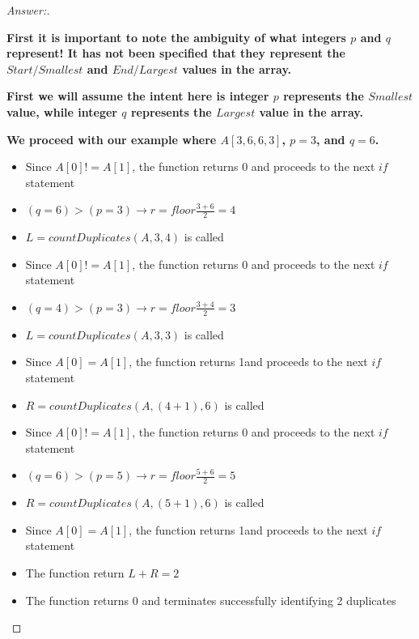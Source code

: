 \documentclass[11pt]{article}
\theoremstyle{definition}
\theoremstyle{definition}
\theoremstyle{definition}
\begin{document}
\begin{proof}[Answer:] \
\item \textbf{First it is important to note the ambiguity of what integers $p$ and $q$ represent! It has not been specified that they represent the $Start / Smallest$ and $End / Largest$ values in the array.}
\item \textbf{First we will assume the intent here is integer $p$ represents the $Smallest$ value, while integer $q$ represents the $Largest$ value in the array.}
\item \textbf{We proceed with our example where $A[3, 6, 6, 3]$, $p = 3$, and $q = 6$.}
\begin{itemize}
\item Since $A[0] != A[1]$, the function returns 0 and proceeds to the next $if$ statement
\item $(q = 6) > (p = 3) \to r = floor \frac{3 + 6}{2} = 4$
\item $L = countDuplicates (A, 3, 4)$ is called
\item Since $A[0] != A[1]$, the function returns 0 and proceeds to the next $if$ statement
\item $(q = 4) > (p = 3) \to r = floor \frac{3 + 4}{2} = 3$
\item $L = countDuplicates (A, 3, 3)$ is called
\item Since $A[0] = A[1]$, the function returns 1and proceeds to the next $if$ statement
\item $R = countDuplicates (A, (4+1), 6)$ is called
\item Since $A[0] != A[1]$, the function returns 0 and proceeds to the next $if$ statement
\item $(q = 6) > (p = 5) \to r = floor \frac{5 + 6}{2} = 5$
\item $R = countDuplicates (A, (5+1), 6)$ is called
\item Since $A[0] = A[1]$, the function returns 1and proceeds to the next $if$ statement
\item The function return $L+R = 2$ 
\item The function returns 0 and terminates successfully identifying 2 duplicates \\


\end{itemize}
\end{proof}
\end{document}
